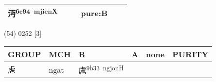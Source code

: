 \documentclass[14pt,a4paper]{scrartcl}
\begin{document}
\begin{longtable}[c]{@{}llllll@{}}
\begin{minipage}[t]{0.14\columnwidth}\raggedright\strut
沔\textsuperscript{6c94~mjienX}
\strut\end{minipage} &
\begin{minipage}[t]{0.14\columnwidth}\raggedright\strut
\strut\end{minipage} &
\begin{minipage}[t]{0.14\columnwidth}\raggedright\strut
\strut\end{minipage} &
\begin{minipage}[t]{0.14\columnwidth}\raggedright\strut
pure:B
\strut\end{minipage}\tabularnewline
\bottomrule
\end{longtable}

(54) 0252 {[}3{]}

\begin{longtable}[c]{@{}llllll@{}}
\toprule
\begin{minipage}[b]{0.14\columnwidth}\raggedright\strut
GROUP
\strut\end{minipage} &
\begin{minipage}[b]{0.14\columnwidth}\raggedright\strut
MCH
\strut\end{minipage} &
\begin{minipage}[b]{0.14\columnwidth}\raggedright\strut
B
\strut\end{minipage} &
\begin{minipage}[b]{0.14\columnwidth}\raggedright\strut
A
\strut\end{minipage} &
\begin{minipage}[b]{0.14\columnwidth}\raggedright\strut
none
\strut\end{minipage} &
\begin{minipage}[b]{0.14\columnwidth}\raggedright\strut
PURITY
\strut\end{minipage}\tabularnewline
\midrule
\endhead
\begin{minipage}[t]{0.14\columnwidth}\raggedright\strut
䖈
\strut\end{minipage} &
\begin{minipage}[t]{0.14\columnwidth}\raggedright\strut
ngat
\strut\end{minipage} &
\begin{minipage}[t]{0.14\columnwidth}\raggedright\strut
鬳\textsuperscript{9b33~ngjonH}
\strut\end{minipage} &
\begin{minipage}[t]{0.14\columnwidth}\raggedright\strut
\strut\end{minipage} &

\end{longtable}
\end{document}
